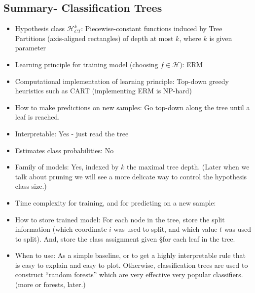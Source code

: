 \documentclass[11pt]{article}
\newcommand{\Hc}{\mathcal{H}}
\begin{document}
\subsection{Summary- Classification Trees}
\begin{itemize}
  \item Hypothesis class $\Hc^k_{CT}$: Piecewise-constant functions induced by Tree
    Partitions (axis-aligned rectangles) of depth at most $k$, where $k$ is
    given parameter
       \item Learning principle for training model (choosing $f\in\Hc$): ERM
	     \item Computational implementation of learning principle:
	       Top-down greedy heuristics such as CART (implementing ERM is
	       NP-hard)
  \item How to make predictions on new samples:  Go top-down along the tree
    until a leaf is reached. 
  \item Interpretable: Yes - just read the tree 
    \item Estimates class probabilities: No 
    \item Family of models: Yes, indexed by $k$ the maximal tree depth. (Later
	when we talk about pruning we will see a more delicate way to control
      the hypothesis class size.)
       \item Time complexity for training, and for predicting on a new sample:
  \item How to store trained model: For each node in the tree, store the split
    information (which coordinate $i$ was used to split, and which value $t$ was used to
    split). And, store the class assignment given §for each leaf in the tree.
    \item When to use: As a simple baseline, or to get a highly interpretable
      rule that is easy to explain and easy to plot. 
      Otherwise, classification trees are used to construct ``random forests''
      which are very effective very popular classifiers. (more or forests,
      later.)
\end{itemize}


% 
\end{document}
